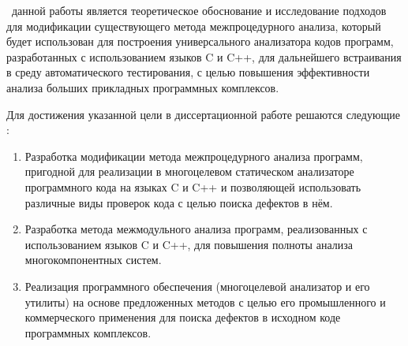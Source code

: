 \aim\ данной работы является теоретическое обоснование и исследование подходов для модификации существующего метода межпроцедурного анализа, который будет использован для построения универсального анализатора кодов программ, разработанных с использованием языков C и C++, для дальнейшего встраивания в среду автоматического тестирования, с целью повышения эффективности анализа больших прикладных программных комплексов.

Для достижения указанной цели в диссертационной работе решаются следующие {\tasks}:
\begin{enumerate}
  \item Разработка модификации метода межпроцедурного анализа программ, пригодной для реализации в многоцелевом статическом анализаторе программного кода на языках C и C++ и позволяющей использовать различные виды проверок кода с целью поиска дефектов в нём.
  \item Разработка метода межмодульного анализа программ, реализованных с использованием языков C и C++, для повышения полноты анализа многокомпонентных систем.
  \item Реализация программного обеспечения (многоцелевой анализатор и его утилиты) на основе предложенных методов с целью его промышленного и коммерческого применения для поиска дефектов в исходном коде программных комплексов.
\end{enumerate}

% 
\novelty

